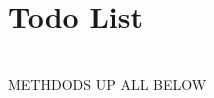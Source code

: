 \chapter{Todo List }
\hypertarget{todo}{}\label{todo}

\begin{DoxyRefList}
\item[{\parbox[t]{\linewidth}{Class \doxylink{class_service_type}{Service\+Type} }}]\hfill \\
\label{todo__todo000001}%
%
METHDODS UP ALL BELOW 
\end{DoxyRefList}